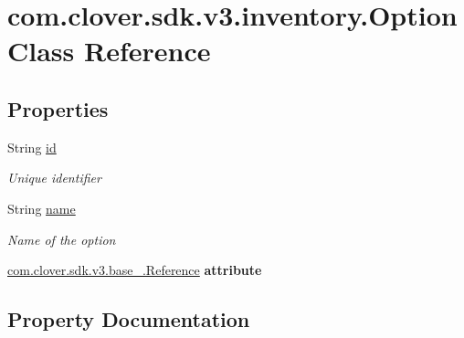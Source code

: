 \hypertarget{classcom_1_1clover_1_1sdk_1_1v3_1_1inventory_1_1_option}{}\section{com.\+clover.\+sdk.\+v3.\+inventory.\+Option Class Reference}
\label{classcom_1_1clover_1_1sdk_1_1v3_1_1inventory_1_1_option}
\subsection*{Properties}
\begin{DoxyCompactItemize}
\item 
String \hyperlink{classcom_1_1clover_1_1sdk_1_1v3_1_1inventory_1_1_option_a1935df102ba458e526af39bbaedd0f84}{id}
\begin{DoxyCompactList}\small\item\em Unique identifier \end{DoxyCompactList}\item 
String \hyperlink{classcom_1_1clover_1_1sdk_1_1v3_1_1inventory_1_1_option_a1e65b5dc17e96ddce0588e7908eb6e45}{name}
\begin{DoxyCompactList}\small\item\em Name of the option \end{DoxyCompactList}\item 
\mbox{\label{classcom_1_1clover_1_1sdk_1_1v3_1_1inventory_1_1_option_acee34514e4f81cdc8320dde8262a5224}} 
\hyperlink{classcom_1_1clover_1_1sdk_1_1v3_1_1base___1_1_reference}{com.\+clover.\+sdk.\+v3.\+base\+\_\+.\+Reference} {\bfseries attribute}
\end{DoxyCompactItemize}


\subsection{Property Documentation}
\mbox{\label{classcom_1_1clover_1_1sdk_1_1v3_1_1inventory_1_1_option_a1935df102ba458e526af39bbaedd0f84}} 
